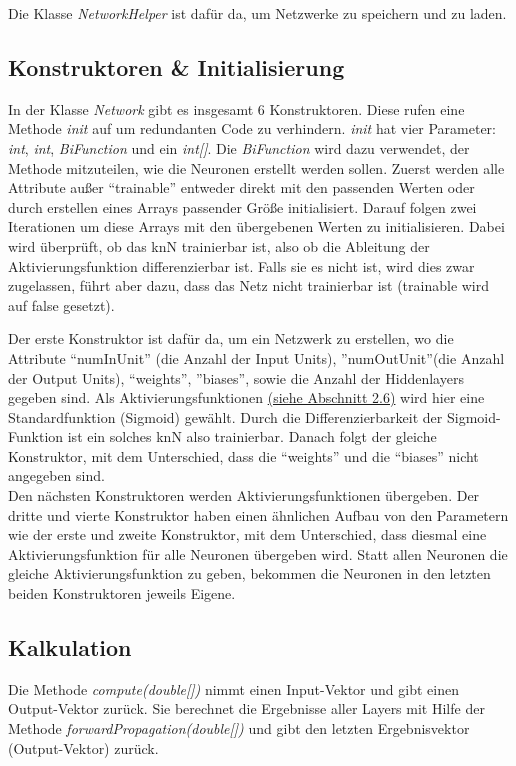 \documentclass[paper=A4,pagesize=auto,12pt,headinclude=true,footinclude=true,BCOR=0mm,DIV=calc]{scrartcl}
\begin{document}
Die Klasse \textit{NetworkHelper} ist dafür da, um Netzwerke zu speichern und zu laden.


\subsection{Konstruktoren \& Initialisierung}
In der Klasse \textit{Network} gibt es insgesamt 6 Konstruktoren.
Diese rufen eine Methode \textit{init} auf um redundanten Code zu verhindern. \textit{init} hat vier Parameter: \textit{int}, \textit{int}, \textit{BiFunction} und ein \textit{int[]}. Die \textit{BiFunction} wird dazu verwendet, der Methode mitzuteilen, wie die Neuronen erstellt werden sollen.
Zuerst werden alle Attribute außer “trainable” entweder direkt mit den passenden Werten oder durch erstellen eines Arrays passender Größe initialisiert.
Darauf folgen zwei Iterationen um diese Arrays mit den übergebenen Werten zu initialisieren. Dabei wird überprüft, ob das knN trainierbar ist, also ob die Ableitung der Aktivierungsfunktion differenzierbar ist. Falls sie es nicht ist, wird dies zwar zugelassen, führt aber dazu, dass das Netz nicht trainierbar ist (trainable wird auf false gesetzt).

Der erste Konstruktor ist dafür da, um ein Netzwerk zu erstellen, wo die Attribute “numInUnit” (die Anzahl der Input Units), ”numOutUnit”(die Anzahl der Output Units), “weights”, ”biases”, sowie die Anzahl der Hiddenlayers gegeben sind. Als Aktivierungsfunktionen \hyperlink{functioning}{(siehe Abschnitt 2.6)} wird hier eine Standardfunktion (Sigmoid) gewählt. Durch die Differenzierbarkeit der Sigmoid-Funktion ist ein solches knN also trainierbar.
Danach folgt der gleiche Konstruktor, mit dem Unterschied, dass die “weights” und die “biases” nicht angegeben sind.
\\
Den nächsten Konstruktoren werden Aktivierungsfunktionen übergeben.
Der dritte und vierte Konstruktor haben einen ähnlichen Aufbau von den Parametern wie der erste und zweite Konstruktor, mit dem Unterschied, dass diesmal eine Aktivierungsfunktion für alle Neuronen übergeben wird.
Statt allen Neuronen die gleiche Aktivierungsfunktion zu geben, bekommen die Neuronen in den letzten beiden Konstruktoren jeweils Eigene.


\subsection{Kalkulation}
Die Methode \textit{compute(double[])} nimmt einen Input-Vektor und gibt einen Output-Vektor zurück. Sie berechnet die Ergebnisse aller Layers mit Hilfe der Methode \textit{forwardPropagation(double[])} und gibt den letzten Ergebnisvektor (Output-Vektor) zurück.
\end{document}
